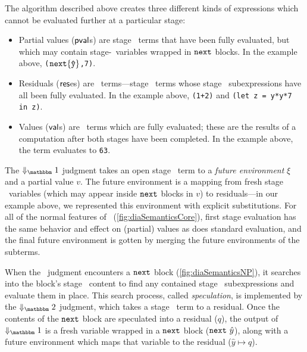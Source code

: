 The algorithm described above creates three different kinds of expressions which
cannot be evaluated further at a particular stage:
\begin{itemize}
\item 
Partial values ($\mathsf{pval}$s) are stage \bbone\ terms that have been fully evaluated, 
but which may contain stage-\bbtwo\ variables wrapped in ${\tt next}$ blocks. 
In the example above, 
\verb|(|${\tt next} \{\mathtt{\hat y}\}$\verb|,7)|.

\item Residuals ($\mathsf{res}$es) are \langTwo\ terms---stage \bbtwo\ terms whose
stage \bbone\ subexpressions have all been fully evaluated. In the example
above,
\verb|(1+2)| and \verb|(let z = y*y*7 in z)|.

\item Values ($\mathsf{val}$s) are \langTwo\ terms which are fully evaluated; these
are the results of a computation after both stages have been completed. In the
example above, the term evaluates to \verb|63|.
\end{itemize}


The $\redonesym$ judgment takes an open stage \bbone\ term to a {\em future
environment} $\xi$ and a partial value $v$.  The future environment is a mapping
from fresh stage \bbtwo\ variables (which may appear inside ${\tt next}$ blocks in
$v$) to residuals---in our example above, we represented this environment with
explicit substitutions. For all of the normal features of \lang\ 
(\ref{fig:diaSemanticsCore}), first stage evaluation has the same behavior and
effect on (partial) values as does standard evaluation, and the final future environment is
gotten by merging the future environments of the subterms.

When the \bbone\ judgment encounters a ${\tt next}$ block (\ref{fig:diaSemanticsNP}), it
searches into the block's stage \bbtwo\ content to find any contained stage
\bbone\ subexpressions and evaluate them in place.  This search process, called
\emph{speculation}, is implemented by the $\redtwosym$ judgment, which takes
a stage \bbtwo\ term to a residual.  Once the contents of the ${\tt next}$ block are
speculated into a residual ($q$), the output of $\redonesym$ is a fresh variable wrapped in a
${\tt next}$ block (${\tt next}~\hat y$), along with a future environment which maps that
variable to the residual ($\hat y \mapsto q$).

